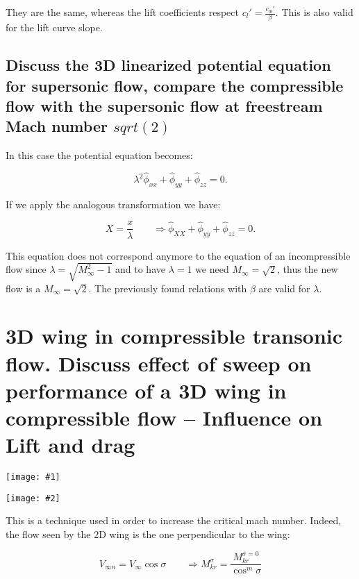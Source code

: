 \documentclass[british,french,11pt, a4paper, openany]{article}
\newcommand{\minifig}[6]{
	\begin{center}%
		\begin{minipage}{#5\textwidth}%
			\texttt{[image: \#1]}%
			\captionof{figure}{}%
			\label{#1}%
		\end{minipage}%
		\begin{minipage}{#6\textwidth}%
			\texttt{[image: \#2]}%
			\captionof{figure}{}%
			\label{#2}%
		\end{minipage}%
	\end{center}
}
\begin{document}
They are the same, whereas the lift coefficients respect $c_l' = \frac{c_{l0}'}{\beta}$. This is also valid for the lift curve slope.

\subsection{Discuss the 3D linearized potential equation for supersonic flow, compare the compressible flow with the supersonic flow at freestream Mach number $sqrt(2)$}
In this case the potential equation becomes:

\begin{equation}
\lambda ^2 \hat{\phi} _{xx} + \hat{\phi} _{yy} + \hat{\phi} _{zz} = 0.
\end{equation}

If we apply the analogous transformation we have:

\begin{equation}
X = \frac{x}{\lambda} \qquad \Rightarrow  \hat{\phi} _{XX} + \hat{\phi} _{yy} + \hat{\phi} _{zz} = 0.
\end{equation}

This equation does not correspond anymore to the equation of an incompressible flow since $\lambda = \sqrt{M_\infty ^2 - 1}$ and to have $\lambda = 1$ we need $M_\infty = \sqrt{2}$, thus the new flow is a $M_\infty = \sqrt{2}$. The previously found relations with $\beta$ are valid for $\lambda$.




\section{3D wing in compressible transonic flow. Discuss effect of sweep on performance of a 3D wing in compressible flow -- Influence on Lift and drag}

\minifig{ch7/2}{ch7/3}{0.15}{0.15}{0.3}{0.3}
This is a technique used in order to increase the critical mach number. Indeed, the flow seen by the 2D wing is the one perpendicular to the wing:

\begin{equation}
V_{\infty n} = V_{\infty}\cos \sigma \qquad \Rightarrow M_{kr}^\sigma= \frac{M_{kr}^{\sigma = 0}}{\cos^m \sigma}
\end{equation}
\end{document}
